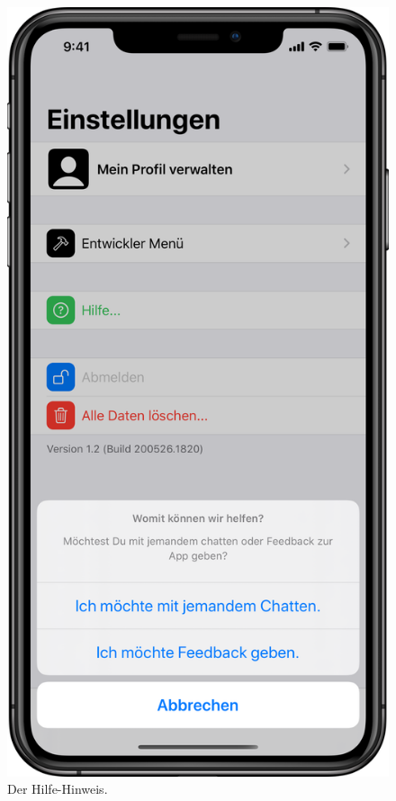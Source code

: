 \begin{minipage}{.45\textwidth}
	\begin{figure}[H]
		\centering
		\includegraphics[width=.68\textwidth]{./images/prototype/ios/helpSheet.png}
		\caption{\label{fig:app:ios:helpSheet}Der Hilfe-Hinweis.}
	\end{figure}
\end{minipage}\hfill

